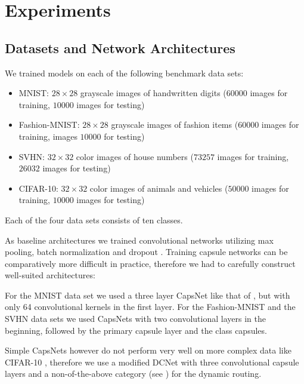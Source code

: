 
\section{Experiments}
\label{sec:experiments}

\subsection{Datasets and Network Architectures}

We trained models on each of the following benchmark data sets:

\begin{itemize}
	\item MNIST: $28\times28$ grayscale images of handwritten digits ($60000$  images for training, $10000$  images for testing) \cite{mnist}
	\item Fashion-MNIST:  $28\times28$ grayscale images of fashion items ($60000$ images for training, images $10000$ for testing) \cite{fashion}
	\item SVHN: $32\times32$ color images of house numbers ($73257$  images for training, $26032$ images for testing) \cite{svhn}
	\item CIFAR-10: $32\times32$ color images of animals and vehicles ($50000$  images for training, $10000$  images for testing) \cite{cifar}
\end{itemize}

Each of the four data sets consists of ten classes.

As baseline architectures we trained convolutional networks utilizing max pooling, batch normalization \citep{batchnorm} and dropout \citep{dropout}.
Training capsule networks can be comparatively more difficult in practice, therefore we had to carefully construct well-suited architectures:

For the MNIST data set we used a three layer CapsNet like that of \citet{capsules}, but with only 64 convolutional kernels in the first layer.
For the Fashion-MNIST and the SVHN data sets we used CapsNets with two convolutional layers in the beginning, followed by the primary capsule layer and the class capsules.

Simple CapsNets however do not perform very well on more complex data like \mbox{CIFAR-10} \citep{complex}, therefore we use a modified DCNet \citep{dcnet} with three convolutional capsule layers and a non-of-the-above category (see ) for the dynamic routing.


